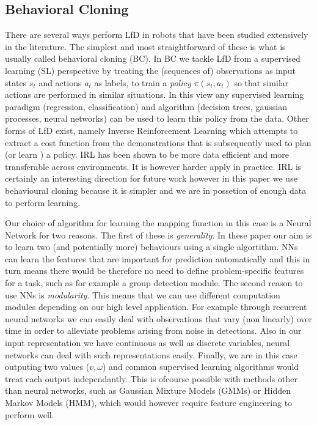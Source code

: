 \documentclass[letterpaper, 10 pt, conference]{ieeeconf}
\begin{document}
\subsection{Behavioral Cloning}
There are several ways perform LfD in robots that have been studied extensively in the literature. The simplest and most straightforward of these is what is usually called behavioral cloning (BC). In BC we tackle LfD from a supervised learning (SL) perspective by treating the (sequences of) observations as input states $s_t$ and actions $a_t$ as labels, to train a \emph{policy} $\pi(s_t,a_t)$ so that similar actions are performed in similar situations. In this view any supervised learning paradigm (regression, classification) and algorithm (decision trees, gaussian processes, neural networks) \cite{bishop2006pattern} can be used to learn this policy from the data. Other forms of LfD exist, namely Inverse Reinforcement Learning \cite{abbeel2004apprenticeship} which attempts to extract a cost function from the demonstrations that is subsequently used to plan (or learn \cite{boularias2011relative}) a policy. IRL has been shown to be more data efficient and more transferable across environments. It is however harder apply in practice. IRL is certainly an interesting direction for future work however in this paper we use behavioural cloning because it is simpler and we are in possetion of enough data to perform learning.

Our choice of algorithm for learning the mapping function in this case is a Neural Network for two reasons. The first of these is \emph{generality}. In these paper our aim is to learn two (and potentially more) behaviours using a single algortithm. NNs can learn the features that are important for prediction automatically and this in turn means there would be therefore no need to define problem-specific features for a task, such as for example a group detection module. The second reason to use NNs is \emph{modularity}. This means that we can use different computation modules depending on our high level application. For example through recurrent neural networks we can easily deal with observations that vary (non linearly) over time in order to alleviate problems arising from noise in detections. Also in our input representation we have continuous as well as discrete variables, neural networks can deal with such representations easily. Finally, we are in this case outputing two values ($v,\omega$) and common supervised learning algorithms would treat each output independantly. This is ofcourse possible with methods other than neural networks, such as Gaussian Mixture Models (GMMs) or Hidden Markov Models (HMM), which would however require feature engineering to perform well.  
\end{document}
